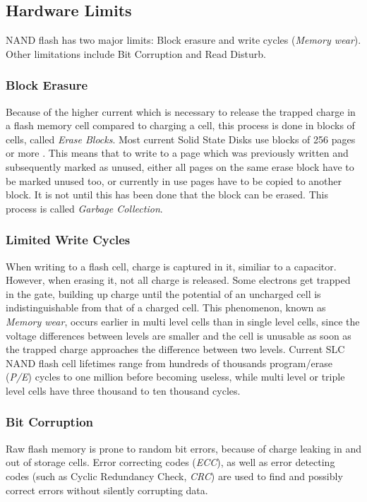 \documentclass{acm_proc_article-sp}
\begin{document}
\subsection{Hardware Limits}
NAND flash has two major limits: Block erasure and write cycles (\emph{Memory wear}). Other limitations include Bit Corruption and Read Disturb.

\subsubsection*{Block Erasure}
Because of the higher current which is necessary to release the trapped charge in a flash memory cell compared to charging a cell, this process is done in blocks of cells, called \emph{Erase Blocks}. Most current Solid State Disks use blocks of 256 pages or more \cite{codecapsule2014coding}.
This means that to write to a page which was previously written and subsequently marked as unused, either all pages on the same erase block have to be marked unused too, or currently in use pages have to be copied to another block. It is not until this has been done that the block can be erased. This process is called \emph{Garbage Collection}.

\subsubsection*{Limited Write Cycles}
When writing to a flash cell, charge is captured in it, similiar to a capacitor. %
However, when erasing it, not all charge is released. Some electrons get trapped in the gate, building up charge until the potential of an uncharged cell is indistinguishable from that of a charged cell. This phenomenon, known as \emph{Memory wear}, occurs earlier in multi level cells than in single level cells, since the voltage differences between levels are smaller and the cell is unusable as soon as the trapped charge approaches the difference between two levels.
Current SLC NAND flash cell lifetimes range from hundreds of thousands program/erase (\emph{P/E}) cycles to one million before becoming useless, while multi level or triple level cells have three thousand to ten thousand cycles.

\subsubsection*{Bit Corruption}
Raw flash memory is prone to random bit errors, because of charge leaking in and out of storage cells. Error correcting codes (\emph{ECC}), as well as error detecting codes (such as Cyclic Redundancy Check, \emph{CRC}) are used to find and possibly correct errors without silently corrupting data.
\end{document}
